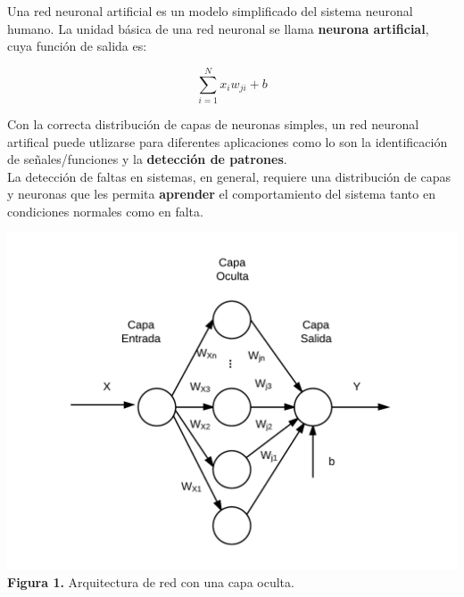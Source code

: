 \documentclass[a0paper,portrait]{baposter}
\begin{document}
\begin{poster}
{\begin{footnotesize}
Una red neuronal artificial es un modelo simplificado del sistema neuronal humano. La unidad básica de una red neuronal se llama \textbf{neurona artificial}, cuya función de salida es:
\end{footnotesize}

\begin{equation}
\sum_{i=1}^{N} x_i w_{ji} + b
\end{equation}


\begin{footnotesize}
Con la correcta distribución de capas de neuronas simples, un red neuronal artifical puede utlizarse para diferentes aplicaciones como lo son la identificación de señales/funciones y la \textbf{detección de patrones}. \\

La detección de faltas en sistemas, en general, requiere una distribución de capas y neuronas que les permita \textbf{aprender} el comportamiento del sistema tanto en condiciones normales como en falta. 
\end{footnotesize}
\begin{center}
\includegraphics[width=\linewidth]{ann}
\\ {\footnotesize \textbf{Figura 1.} Arquitectura de red con una capa oculta.}
\end{center}

}
\end{poster}
\end{document}
